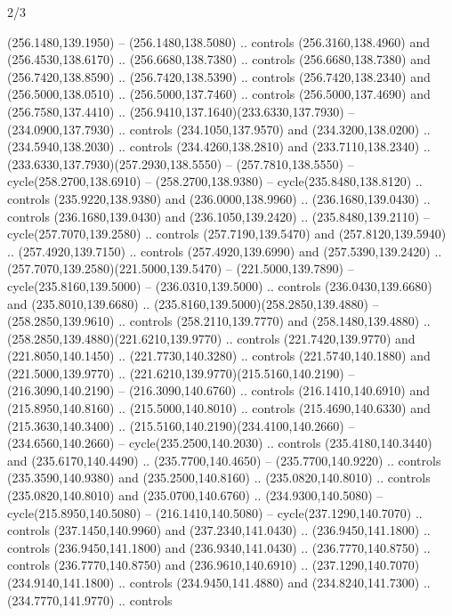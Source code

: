 \begin{flagdescription}{2/3}
\begin{scope}[xshift=0.5\flaglength,yshift=0.5\flagwidth,scale=\flagwidth/259.2]
\begin{scope}[y=0.8pt, x=0.8pt, yscale=-1,shift={(-243,-162)}]
      (256.1480,139.1950) -- (256.1480,138.5080) .. controls (256.3160,138.4960) and
      (256.4530,138.6170) .. (256.6680,138.7380) .. controls (256.6680,138.7380) and
      (256.7420,138.8590) .. (256.7420,138.5390) .. controls (256.7420,138.2340) and
      (256.5000,138.0510) .. (256.5000,137.7460) .. controls (256.5000,137.4690) and
      (256.7580,137.4410) .. (256.9410,137.1640)(233.6330,137.7930) --
      (234.0900,137.7930) .. controls (234.1050,137.9570) and (234.3200,138.0200) ..
      (234.5940,138.2030) .. controls (234.4260,138.2810) and (233.7110,138.2340) ..
      (233.6330,137.7930)(257.2930,138.5550) -- (257.7810,138.5550) --
      cycle(258.2700,138.6910) -- (258.2700,138.9380) -- cycle(235.8480,138.8120) ..
      controls (235.9220,138.9380) and (236.0000,138.9960) .. (236.1680,139.0430) ..
      controls (236.1680,139.0430) and (236.1050,139.2420) .. (235.8480,139.2110) --
      cycle(257.7070,139.2580) .. controls (257.7190,139.5470) and
      (257.8120,139.5940) .. (257.4920,139.7150) .. controls (257.4920,139.6990) and
      (257.5390,139.2420) .. (257.7070,139.2580)(221.5000,139.5470) --
      (221.5000,139.7890) -- cycle(235.8160,139.5000) -- (236.0310,139.5000) ..
      controls (236.0430,139.6680) and (235.8010,139.6680) ..
      (235.8160,139.5000)(258.2850,139.4880) -- (258.2850,139.9610) .. controls
      (258.2110,139.7770) and (258.1480,139.4880) ..
      (258.2850,139.4880)(221.6210,139.9770) .. controls (221.7420,139.9770) and
      (221.8050,140.1450) .. (221.7730,140.3280) .. controls (221.5740,140.1880) and
      (221.5000,139.9770) .. (221.6210,139.9770)(215.5160,140.2190) --
      (216.3090,140.2190) -- (216.3090,140.6760) .. controls (216.1410,140.6910) and
      (215.8950,140.8160) .. (215.5000,140.8010) .. controls (215.4690,140.6330) and
      (215.3630,140.3400) .. (215.5160,140.2190)(234.4100,140.2660) --
      (234.6560,140.2660) -- cycle(235.2500,140.2030) .. controls
      (235.4180,140.3440) and (235.6170,140.4490) .. (235.7700,140.4650) --
      (235.7700,140.9220) .. controls (235.3590,140.9380) and (235.2500,140.8160) ..
      (235.0820,140.8010) .. controls (235.0820,140.8010) and (235.0700,140.6760) ..
      (234.9300,140.5080) -- cycle(215.8950,140.5080) -- (216.1410,140.5080) --
      cycle(237.1290,140.7070) .. controls (237.1450,140.9960) and
      (237.2340,141.0430) .. (236.9450,141.1800) .. controls (236.9450,141.1800) and
      (236.9340,141.0430) .. (236.7770,140.8750) .. controls (236.7770,140.8750) and
      (236.9610,140.6910) .. (237.1290,140.7070)(234.9140,141.1800) .. controls
      (234.9450,141.4880) and (234.8240,141.7300) .. (234.7770,141.9770) .. controls

\end{scope}
\end{scope}
\end{flagdescription}
